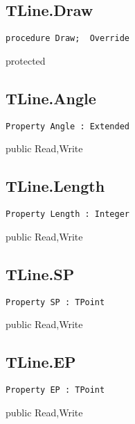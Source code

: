 \subsection{TLine.Draw}
\label{hmi:drawncontrol:tline:draw}
\begin{FPCList}
\Declaration 

\begin{verbatim}
procedure Draw;  Override
\end{verbatim}
\Visibility
protected
\end{FPCList}
\subsection{TLine.Angle}
\label{hmi:drawncontrol:tline:angle}
\begin{FPCList}
\Declaration 

\begin{verbatim}
Property Angle : Extended
\end{verbatim}
\Visibility
public
\Access
Read,Write
\end{FPCList}
\subsection{TLine.Length}
\label{hmi:drawncontrol:tline:length}
\begin{FPCList}
\Declaration 

\begin{verbatim}
Property Length : Integer
\end{verbatim}
\Visibility
public
\Access
Read,Write
\end{FPCList}
\subsection{TLine.SP}
\label{hmi:drawncontrol:tline:sp}
\begin{FPCList}
\Declaration 

\begin{verbatim}
Property SP : TPoint
\end{verbatim}
\Visibility
public
\Access
Read,Write
\end{FPCList}
\subsection{TLine.EP}
\label{hmi:drawncontrol:tline:ep}
\begin{FPCList}
\Declaration 

\begin{verbatim}
Property EP : TPoint
\end{verbatim}
\Visibility
public
\Access
Read,Write
\end{FPCList}
